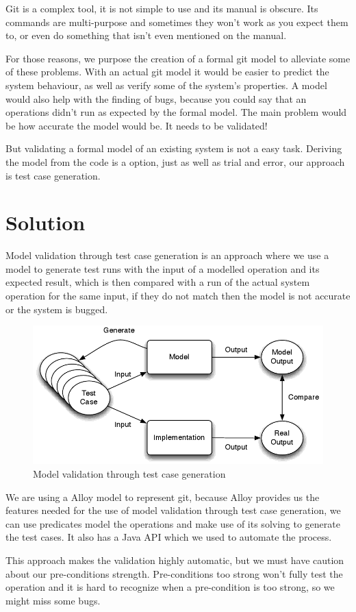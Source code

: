 Git is a complex tool, it is not simple to use and its manual is obscure.
Its commands are multi-purpose and sometimes they won't work as you expect them to, or even do something that isn't even mentioned on the manual.


For those reasons, we purpose the creation of a formal git model to alleviate some of these problems.
With an actual git model it would be easier to predict the system behaviour, as well as verify some of the system's properties.
A model would also help with the finding of bugs, because you could say that an operations didn't run as expected by the formal model.
The main problem would be how accurate the model would be. It needs to be validated!


But validating a formal model of an existing system is not a easy task. Deriving the model from the code is a option, just as well as trial and error, our approach is test case generation.

\section{Solution}


Model validation through test case generation is an approach where we use a model to generate test runs with the input of a modelled operation and its expected result, which is then compared with a run of the actual system operation for the same input, if they do not match then the model is not accurate or the system is bugged.

\begin{figure}[H]
\centering
\includegraphics[width=\textwidth]{images/test-case.png}
\caption{Model validation through test case generation}
\end{figure}


We are using a Alloy\cite{alloy} model to represent git, because Alloy provides us the features needed for the use of model validation through test case generation, we can use predicates model the operations and make use of its solving to generate the test cases. It also has a Java API which we used to automate the process.


This approach makes the validation highly automatic, but we must have caution about our pre-conditions strength. Pre-conditions too strong won't fully test the operation and it is hard to recognize when a pre-condition is too strong, so we might miss some bugs.



